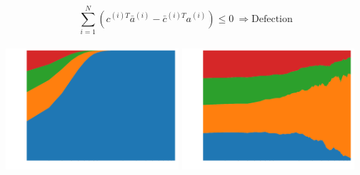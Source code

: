 \documentclass{beamer}
\begin{document}
\begin{frame}
    \begin{center}
    
    \end{center}
\end{frame}

\begin{frame}
    \begin{center}
        
    \end{center}
\end{frame}

\begin{frame}
    \begin{center}
    \[\sum_{i=1} ^ N (c^{(i)T} \bar{a}^{(i)} - \bar{c}^{(i)T} a^{(i)}) \leq 0 \ \Rightarrow \text{Defection}\] \\ \vspace{.5cm}
    \pause
    \includegraphics[width=0.48\textwidth]{static/population_defection_takes_over.png}\hspace{6pt}
    \includegraphics[width=0.48\textwidth]{static/population_defection_fails.png}\vspace{10pt}

    \end{center}
\end{frame}


\begin{frame}
    \begin{center}
    
    \end{center}
\end{frame}
\end{document}
